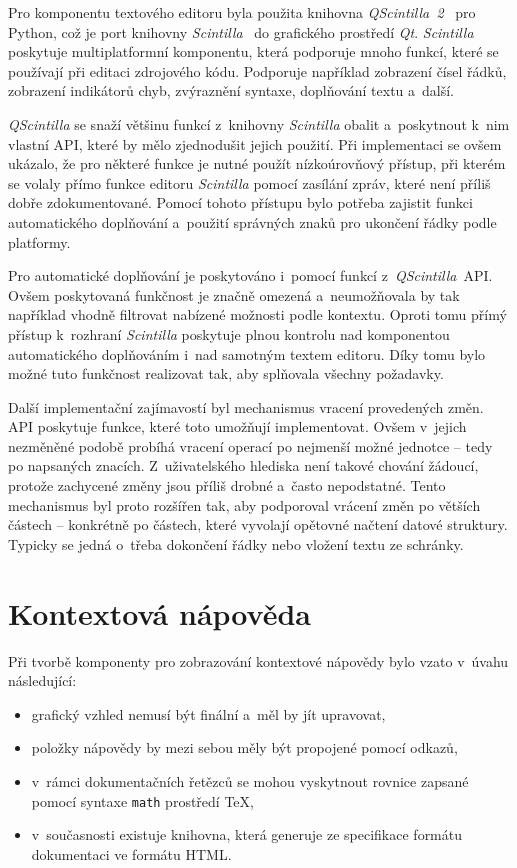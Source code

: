 \documentclass[FM,bw,DP]{tulthesis}
\begin{document}
Pro komponentu textového editoru byla použita knihovna \textit{QScintilla~2}~\cite{bib:qscintilla2-python} pro Python, což je port knihovny \textit{Scintilla}~\cite{bib:scintilla} do grafického prostředí \textit{Qt}. \textit{Scintilla} poskytuje multiplatformní komponentu, která podporuje mnoho funkcí, které se používají při editaci zdrojového kódu. Podporuje například zobrazení čísel řádků, zobrazení indikátorů chyb, zvýraznění syntaxe, doplňování textu a~další.

\textit{QScintilla} se snaží většinu funkcí z~knihovny \textit{Scintilla} obalit a~poskytnout k~nim vlastní \gls{API}, které by mělo zjednodušit jejich použití. Při implementaci se ovšem ukázalo, že pro některé funkce je nutné použít nízkoúrovňový přístup, při kterém se volaly přímo funkce editoru \textit{Scintilla} pomocí zasílání zpráv, které není příliš dobře zdokumentované. Pomocí tohoto přístupu bylo potřeba zajistit funkci automatického doplňování a~použití správných znaků pro ukončení řádky podle platformy.

Pro automatické doplňování je poskytováno i~pomocí funkcí z~\textit{QScintilla}~\gls{API}. Ovšem poskytovaná funkčnost je značně omezená a~neumožňovala by tak například vhodně filtrovat nabízené možnosti podle kontextu. Oproti tomu přímý přístup k~rozhraní \textit{Scintilla} poskytuje plnou kontrolu nad komponentou automatického doplňováním i~nad samotným textem editoru. Díky tomu bylo možné tuto funkčnost realizovat tak, aby splňovala všechny požadavky.

Další implementační zajímavostí byl mechanismus vracení provedených změn. \gls{API} poskytuje funkce, které toto umožňují implementovat. Ovšem v~jejich nezmě\-ně\-né podobě probíhá vracení operací po nejmenší možné jednotce -- tedy po napsaných znacích. Z~uživatelského hlediska není takové chování žádoucí, protože zachycené změny jsou příliš drobné a~často nepodstatné. Tento mechanismus byl proto rozšířen tak, aby podporoval vrácení změn po větších částech -- konkrétně po částech, které vyvolají opětovné načtení datové struktury. Typicky se jedná o~třeba dokončení řádky nebo vložení textu ze schránky.

\section{Kontextová nápověda}

Při tvorbě komponenty pro zobrazování kontextové nápovědy bylo vzato v~úvahu následující:

\begin{itemize}
\item grafický vzhled nemusí být finální a~měl by jít upravovat,
\item položky nápovědy by mezi sebou měly být propojené pomocí odkazů,
\item v~rámci dokumentačních řetězců se mohou vyskytnout rovnice zapsané pomocí syntaxe \texttt{math} prostředí \TeX,
\item v~současnosti existuje knihovna, která generuje ze specifikace formátu dokumentaci ve formátu \gls{HTML}.
\end{itemize}
\end{document}
